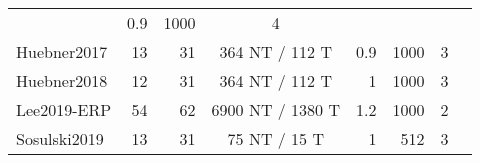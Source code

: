 \begin{tabularx}{\linewidth}{@{}Xrrcrrrr@{}}
                   &0.9&1000& 4                          &                                          \\
		Huebner2017    & 13                         & 31          & 364 NT / 112 T
                   &0.9&1000& 3                          &                                          \\
		Huebner2018    & 12                         & 31          & 364 NT / 112 T
                   &1&1000& 3                          &                                          \\
		Lee2019-ERP   & 54                         & 62          & 6900 NT / 1380
    T         &1.2&1000& 2                          &                                          \\
		Sosulski2019   & 13                         & 31          & 75 NT / 15 T
                   &1&512& 3                          &                                          \\ \bottomrule
	\end{tabularx}

